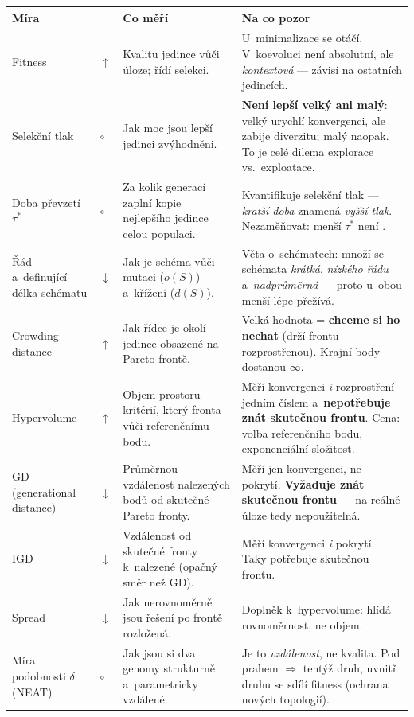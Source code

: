 \documentclass[11pt,a4paper]{article}
\makeatletter
\newcommand{\up}{\textcolor{upcol}{$\boldsymbol{\uparrow}$}}
\newcommand{\down}{\textcolor{downcol}{$\boldsymbol{\downarrow}$}}
\newcommand{\neut}{$\circ$}
\newenvironment{mirytab}{%
  \par\medskip\noindent\small
  \begin{tabular}{@{}>{\raggedright\arraybackslash}p{3.15cm}
                    >{\centering\arraybackslash}p{0.85cm}
                    >{\raggedright\arraybackslash}p{5.3cm}
                    >{\raggedright\arraybackslash}p{6.1cm}@{}}
  \toprule
  \textbf{Míra} & & \textbf{Co měří} & \textbf{Na co pozor} \\
  \midrule}%
  {\bottomrule\end{tabular}\par\medskip}
\makeatother
\begin{document}
\begin{mirytab}
Fitness & \up &
Kvalitu jedince vůči úloze; řídí selekci. &
U~minimalizace se otáčí. V~koevoluci není absolutní, ale \emph{kontextová} --- závisí na
ostatních jedincích. \\[2pt]

Selekční tlak & \neut &
Jak moc jsou lepší jedinci zvýhodněni. &
\textbf{Není lepší velký ani malý}: velký urychlí konvergenci, ale zabije diverzitu;
malý naopak. To je celé dilema explorace vs.\ exploatace. \\[2pt]

Doba převzetí $\tau^*$ & \neut &
Za kolik generací zaplní kopie nejlepšího jedince celou populaci. &
Kvantifikuje selekční tlak --- \emph{kratší doba} znamená \emph{vyšší tlak}.
Nezaměňovat: menší $\tau^*$ není \uv{lepší}. \\[2pt]

Řád a~definující délka schématu & \down &
Jak je schéma \uv{křehké} vůči mutaci ($o(S)$) a~křížení ($d(S)$). &
Věta o~schématech: množí se schémata \emph{krátká}, \emph{nízkého řádu}
a~\emph{nadprůměrná} --- proto u~obou menší lépe přežívá. \\[2pt]

Crowding distance & \up &
Jak řídce je okolí jedince obsazené na Pareto frontě. &
Velká hodnota = \textbf{chceme si ho nechat} (drží frontu rozprostřenou).
Krajní body dostanou $\infty$. \\[2pt]

Hypervolume & \up &
Objem prostoru kritérií, který fronta \uv{ukrojila} vůči referenčnímu bodu. &
Měří konvergenci \emph{i} rozprostření jedním číslem a~\textbf{nepotřebuje znát
skutečnou frontu}. Cena: volba referenčního bodu, exponenciální složitost. \\[2pt]

GD (generational distance) & \down &
Průměrnou vzdálenost nalezených bodů od skutečné Pareto fronty. &
Měří jen konvergenci, ne pokrytí. \textbf{Vyžaduje znát skutečnou frontu} --- na reálné
úloze tedy nepoužitelná. \\[2pt]

IGD & \down &
Vzdálenost od skutečné fronty k~nalezené (opačný směr než GD). &
Měří konvergenci \emph{i} pokrytí. Taky potřebuje skutečnou frontu. \\[2pt]

Spread & \down &
Jak nerovnoměrně jsou řešení po frontě rozložená. &
Doplněk k~hypervolume: hlídá rovnoměrnost, ne objem. \\[2pt]

Míra podobnosti $\delta$ (NEAT) & \neut &
Jak jsou si dva genomy strukturně a~parametricky vzdálené. &
Je to \emph{vzdálenost}, ne kvalita. Pod prahem $\Rightarrow$ tentýž druh, uvnitř
druhu se sdílí fitness (ochrana nových topologií). \\
\end{mirytab}
\end{document}
